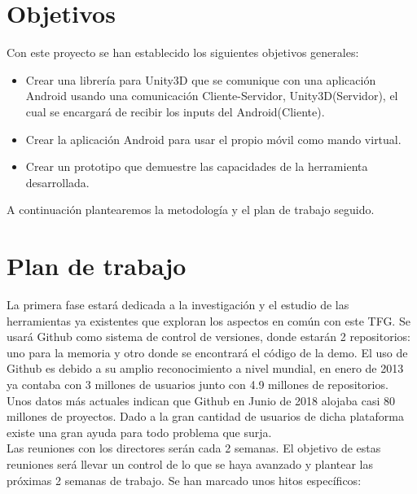 \section{Objetivos}
\label{cap3:sec:obejtivos}

Con este proyecto se han establecido los siguientes objetivos generales:

\begin{itemize}
\item Crear una librer\'ia para Unity3D que se comunique con una aplicaci\'on Android usando una comunicaci\'on Cliente-Servidor, Unity3D(Servidor), el cual se encargar\'a de recibir los inputs del Android(Cliente).
\item Crear la aplicaci\'on Android para usar el propio m\'ovil como mando virtual.
\item Crear un prototipo que demuestre las capacidades de la herramienta desarrollada.
\end{itemize}

A continuaci\'on plantearemos la metodolog\'ia y el plan de trabajo seguido.


\section{Plan de trabajo}
\label{cap3:sec:plandetrabajo}

La primera fase estar\'a dedicada a la investigaci\'on y el estudio de las herramientas ya existentes que exploran los aspectos en com\'un con este TFG. Se usar\'a Github como sistema de control de versiones, donde estar\'an 2 repositorios: uno para la memoria y otro donde se encontrar\'a el c\'odigo de la demo. El uso de Github es debido a su amplio reconocimiento a nivel mundial, en enero de 2013 ya contaba con 3 millones de usuarios junto con 4.9 millones de repositorios. Unos datos más actuales indican que Github en Junio de 2018 alojaba casi 80 millones de proyectos. Dado a la gran cantidad de usuarios de dicha plataforma existe una gran ayuda para todo problema que surja.
\\
Las reuniones con los directores ser\'an cada 2 semanas. El objetivo de estas reuniones ser\'a llevar un control de lo que se haya avanzado y plantear las pr\'oximas 2 semanas de trabajo.
Se han marcado unos hitos espec\'ificos:

